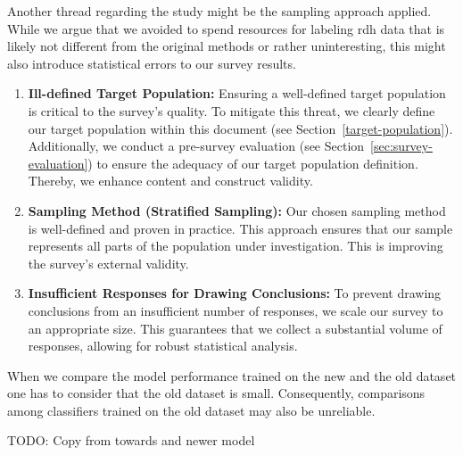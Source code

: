\documentclass[%
class=scrreprt,
chapterprefix=false,%
open=right,%
twoside=false,%
paper=a4,%
logofile={Logo\_zentral\_farbig\_EN.png},%
thesistype=master,%
UKenglish,%
]{se2thesis}
\theoremstyle{definition}
\begin{document}
	Another thread regarding the study might be the sampling approach applied. While we argue that we avoided to spend resources for labeling rdh data that is likely not different from the original methods or rather uninteresting, this might also introduce statistical errors to our survey results.
	
	\begin{enumerate}
		\item \textbf{Ill-defined Target Population:} Ensuring a well-defined target population is critical to the survey's quality. To mitigate this threat, we clearly define our target population within this document (see Section~\ref{target-population}). Additionally, we conduct a pre-survey evaluation (see Section~\ref{sec:survey-evaluation}) to ensure the adequacy of our target population definition. Thereby, we enhance content and construct validity.
		
		\item \textbf{Sampling Method (Stratified Sampling):} Our chosen sampling method is well-defined and proven in practice. This approach ensures that our sample represents all parts of the population under investigation. This is improving the survey's external validity.
		
		\item \textbf{Insufficient Responses for Drawing Conclusions:} To prevent drawing conclusions from an insufficient number of responses, we scale our survey to an appropriate size. This guarantees that we collect a substantial volume of responses, allowing for robust statistical analysis.
	\end{enumerate}
	
	When we compare the model performance trained on the new and the old dataset one has to consider that the old dataset is small. Consequently, comparisons among classifiers trained on the old dataset may also be unreliable.
	
	
	TODO: Copy from towards and newer model
	

	
\end{document}
